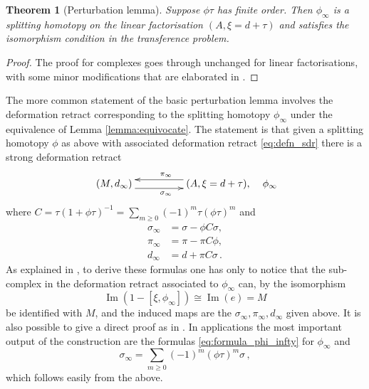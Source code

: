 \documentclass[english,letter paper,12pt,leqno]{article}
\newtheorem{theorem}{Theorem}[section]
\theoremstyle{example}
\numberwithin{equation}{section}
\def\im{\operatorname{Im}}
\def\be{\begin{equation}}
\def\ee{\end{equation}}
\begin{document}
\begin{theorem}[Perturbation lemma]\label{theorem:pertlemma} Suppose $\phi \tau$ has finite order. Then $\phi_\infty$ is a splitting homotopy on the linear factorisation $(A, \xi = d + \tau)$ and satisfies the isomorphism condition in the transference problem.
\end{theorem}
\begin{proof}
The proof for complexes \cite[p.886]{barneslambe} goes through unchanged for linear factorisations, with some minor modifications that are elaborated in \cite[\S 2.5]{lgdual}.
\end{proof}

The more common statement of the basic perturbation lemma involves the deformation retract corresponding to the splitting homotopy $\phi_\infty$ under the equivalence of Lemma \ref{lemma:equivocate}. The statement is that given a splitting homotopy $\phi$ as above with associated deformation retract \eqref{eq:defn_sdr} there is a strong deformation retract
\begin{equation}\label{eq:perturbedsdr}
\xymatrix@C+2pc{
(M,d_\infty) \ar@<-1ex>[r]_{\sigma_\infty} & (A, \xi = d + \tau), \ar@<-1ex>[l]_{\pi_\infty}
} \quad \phi_\infty
\end{equation}
where $C = \tau( 1 + \phi \tau )^{-1} = \sum_{m \ge 0} (-1)^m \tau (\phi \tau)^m$ and
\begin{align*}
\sigma_\infty &= \sigma - \phi C \sigma,\\
\pi_\infty &= \pi - \pi C \phi,\\
d_\infty &= d + \pi C \sigma\,.
\end{align*}
As explained in \cite{barneslambe}, to derive these formulas one has only to notice that the sub-complex in the deformation retract associated to $\phi_\infty$ can, by the isomorphism
\[
\im(1 - [\xi, \phi_\infty]) \cong \im(e) = M
\]
be identified with $M$, and the induced maps are the $\sigma_\infty, \pi_\infty, d_\infty$ given above. It is also possible to give a direct proof as in \cite{crainic}. In applications the most important output of the construction are the formulas \eqref{eq:formula_phi_infty} for $\phi_\infty$ and%
\be
\sigma_\infty = \sum_{m \ge 0} (-1)^m (\phi \tau)^m \sigma\,,
\ee
which follows easily from the above.
\end{document}

